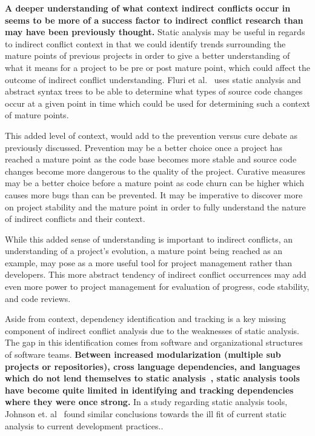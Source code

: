 \documentclass[conference]{IEEEtran}
\begin{document}
\textbf{A deeper understanding of what context indirect conflicts occur in seems to be more of a success factor to indirect conflict
research than may have been previously thought.} Static analysis may be useful in regards to indirect conflict context in that we
could identify trends surrounding the mature points of previous projects in order to give a better understanding of what it
means for a project to be pre or post mature point, which could affect the outcome of indirect conflict understanding.
Fluri et al.~\cite{Fluri:2007:CDT} uses static analysis and abstract syntax trees to be able to determine what types of source code
changes occur at a given point in time which could be used for determining such a context of mature points.

This added level of context,
would add to the prevention versus cure debate as previously discussed. Prevention may be a better
choice once a project has reached a mature point as the code base becomes more stable and source code changes become more dangerous
to the quality of the project. Curative measures may be a better choice before a mature point as code churn can be higher which
causes more bugs than can be prevented. It may be imperative to discover more on project stability
and the mature point in order to fully understand the nature of indirect conflicts and their context.

While this added sense of understanding is important to indirect conflicts, an understanding of a project's evolution,
a mature point being reached as an example,
may pose as a more useful tool for project management rather than developers. This more abstract tendency of indirect
conflict occurrences may add even more power to project management for evaluation of progress, code stability, and code reviews.

Aside from context, dependency identification and tracking is a key missing component of
indirect conflict analysis due to the weaknesses of static analysis. The gap in this identification comes from software and
organizational structures of software teams. \textbf{Between increased modularization (multiple sub projects or repositories),
cross language dependencies, and languages which do not lend themselves to static analysis~\cite{Jensen:2011:MHD}, static analysis tools have
become quite limited in identifying and tracking dependencies where they were once strong.}
In a study regarding static analysis tools, Johnson et. al~\cite{Johnson:2013:WDS} found similar conclusions towards the
ill fit of current static analysis to current development practices..
\end{document}

